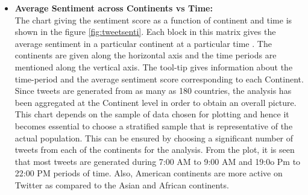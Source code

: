 \documentclass[9pt,twocolumn,twoside]{../../styles/osajnl}
\begin{document}
\begin{itemize}
    \item \textbf{Average Sentiment across Continents vs Time:}\\
    The chart giving the sentiment score as a function of continent and time is shown in the figure \ref{fig:tweetsenti}. Each block in this matrix gives the average sentiment in a particular continent at a particular time \cite{www-contisenti}. The continents are given along the horizontal axis and the time periods are mentioned along the vertical axis. The tool-tip gives information about the time-period and the average sentiment score corresponding to each Continent. Since tweets are generated from as many as 180 countries, the analysis has been aggregated at the Continent level in order to obtain an overall picture. This chart depends on the sample of data chosen for plotting and hence it becomes essential to choose a stratified sample that is representative of the actual population. This can be ensured by choosing a significant number of tweets from each of the continents for the analysis. From the plot, it is seen that most tweets are generated during 7:00 AM to 9:00 AM and 19:0o Pm to 22:00 PM periods of time. Also, American continents are more active on Twitter as compared to the Asian and African continents. 
\end{itemize}
\end{document}

